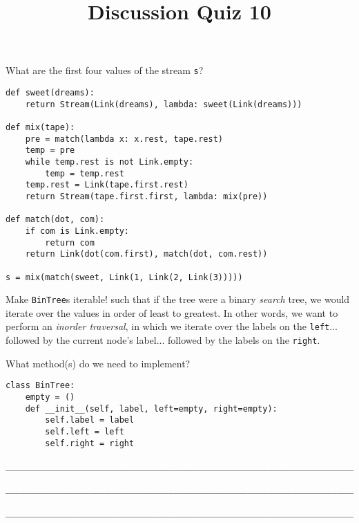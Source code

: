 \documentclass[twoside]{article}
\title{\sc Discussion Quiz 10}
\begin{document}
\maketitle

\begin{enumerate}

What are the first four values of the stream \lstinline{s}?
\vspace{0.1in}

\begin{lstlisting}
def sweet(dreams):
    return Stream(Link(dreams), lambda: sweet(Link(dreams)))

def mix(tape):
    pre = match(lambda x: x.rest, tape.rest)
    temp = pre
    while temp.rest is not Link.empty:
        temp = temp.rest
    temp.rest = Link(tape.first.rest)
    return Stream(tape.first.first, lambda: mix(pre))

def match(dot, com):
    if com is Link.empty:
        return com
    return Link(dot(com.first), match(dot, com.rest))

s = mix(match(sweet, Link(1, Link(2, Link(3)))))
\end{lstlisting}

\newpage


Make \lstinline{BinTree}s iterable! such that if the tree were a binary \textit{search} tree, we would iterate over the values in order of least to greatest. In other words, we want to perform an \textit{inorder traversal}, in which we iterate over the labels on the \lstinline{left}... followed by the current node's label... followed by the labels on the \lstinline{right}.

What method(s) do we need to implement?
\vspace{0.1in}

\begin{lstlisting}
class BinTree:
    empty = ()
    def __init__(self, label, left=empty, right=empty):
        self.label = label
        self.left = left
        self.right = right
        
____________________________________________________________________________
        
____________________________________________________________________________
        
____________________________________________________________________________
        

\end{lstlisting}
\end{enumerate}
\end{document}
